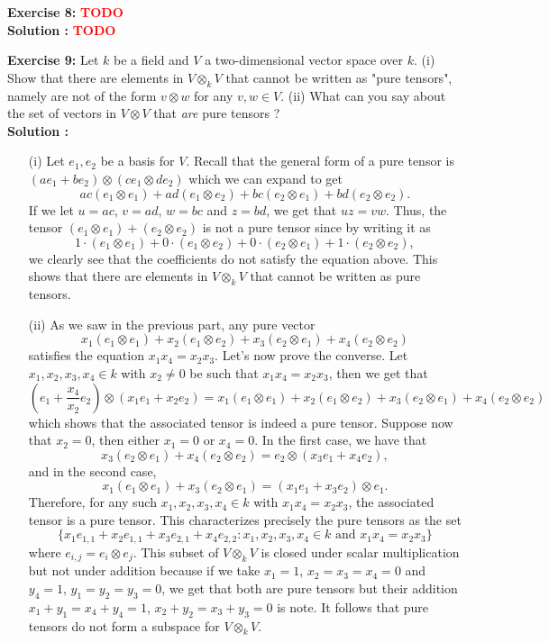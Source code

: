 \documentclass{article}
\newcommand{\td}{\textcolor{red}{\textbf{TODO}}}
\begin{document}
\newpage

\noindent \textbf{Exercise 8:} \td\\

\noindent \textbf{Solution :} \td

\newpage

\noindent \textbf{Exercise 9:} Let $k$ be a field and $V$ a two-dimensional vector space over $k$. (i) Show that there are elements in $V \otimes_k V$ that cannot be written as "pure tensors", namely are not of the form $v \otimes w$ for any $v,w \in V$. (ii) What can you say about the set of vectors in $V \otimes V$ that \textit{are} pure tensors ? \\

\noindent \textbf{Solution :}
\begin{enumerate}
    \item[(i)] Let $e_1, e_2$ be a basis for $V$. Recall that the general form of a pure tensor is $(ae_1 + be_2)\otimes (ce_1 \otimes de_2)$ which we can expand to get
    $$ac (e_1 \otimes e_1) + ad(e_1 \otimes e_2) + bc(e_2 \otimes e_1) + bd(e_2 \otimes e_2).$$ 
    If we let $u = ac$, $v = ad$, $w = bc$ and $z = bd$, we get that $uz = vw$. Thus, the tensor $(e_1 \otimes e_1) + (e_2 \otimes e_2)$ is not a pure tensor since by writing it as
    $$1\cdot (e_1 \otimes e_1) + 0\cdot(e_1 \otimes e_2) + 0 \cdot (e_2 \otimes e_1) + 1 \cdot (e_2 \otimes e_2),$$
    we clearly see that the coefficients do not satisfy the equation above. This shows that there are elements in $V \otimes_k V$ that cannot be written as pure tensors.
    \item[(ii)] As we saw in the previous part, any pure vector
    $$x_1 (e_1 \otimes e_1) + x_2(e_1 \otimes e_2) + x_3 (e_2 \otimes e_1) + x_4 (e_2 \otimes e_2)$$
    satisfies the equation $x_1x_4 = x_2 x_3$. Let's now prove the converse. Let $x_1, x_2, x_3, x_4 \in k$ with $x_2 \neq 0$ be such that $x_1x_4 = x_2 x_3$, then we get that
    $$\left(e_1 + \frac{x_4}{x_2}e_2\right) \otimes (x_1e_1 + x_2 e_2) = x_1 (e_1 \otimes e_1) + x_2(e_1 \otimes e_2) + x_3 (e_2 \otimes e_1) + x_4 (e_2 \otimes e_2)$$
    which shows that the associated tensor is indeed a pure tensor. Suppose now that $x_2 = 0$, then either $x_1 = 0$ or $x_4 = 0$. In the first case, we have that
    $$x_3(e_2\otimes e_1) + x_4 (e_2 \otimes e_2) = e_2 \otimes (x_3 e_1 + x_4 e_2),$$
    and in the second case,
    $$x_1(e_1\otimes e_1) + x_3 (e_2 \otimes e_1) = (x_1e_1 + x_3e_2) \otimes e_1.$$
    Therefore, for any such $x_1, x_2, x_3, x_4 \in k$ with $x_1 x_4 = x_2 x_3$, the associated tensor is a pure tensor. This characterizes precisely the pure tensors as the set
    $$\{x_1e_{1,1} + x_2e_{1,1} + x_3e_{2,1} + x_4e_{2,2} : x_1, x_2, x_3, x_4 \in k \text{ and }x_1x_4 = x_2x_3\}$$
    where $e_{i,j} = e_i \otimes e_j$. This subset of $V \otimes_k V$ is closed under scalar multiplication but not under addition because if we take $x_1 = 1$, $x_2 = x_3 = x_4 = 0$ and $y_4 = 1$, $y_1 = y_2 = y_3 = 0$, we get that both are pure tensors but their addition $x_1 + y_1 = x_4 + y_4 = 1$, $x_2 + y_2 = x_3 + y_3 = 0$ is note. It follows that pure tensors do not form a subspace for $V \otimes_k V$.
\end{enumerate}
\end{document}
